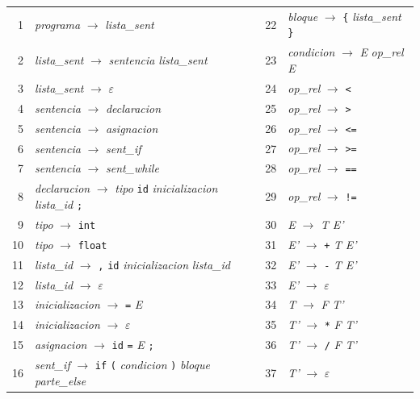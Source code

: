 \documentclass[12pt]{article}
\newcommand{\nt}[1]{\textit{#1}}
\begin{document}
\begin{table}[!htbp]
\centering\footnotesize
\renewcommand{\arraystretch}{1.1}
\begin{tabular}{@{}r l @{\hspace{0.8cm}} r l@{}}
\toprule
1 & \nt{programa} $\rightarrow$ \nt{lista\_sent} & 22 & \nt{bloque} $\rightarrow$ \texttt{\{} \nt{lista\_sent} \texttt{\}} \\
2 & \nt{lista\_sent} $\rightarrow$ \nt{sentencia} \nt{lista\_sent} & 23 & \nt{condicion} $\rightarrow$ \nt{E} \nt{op\_rel} \nt{E} \\
3 & \nt{lista\_sent} $\rightarrow$ $\varepsilon$ & 24 & \nt{op\_rel} $\rightarrow$ \texttt{<} \\
4 & \nt{sentencia} $\rightarrow$ \nt{declaracion} & 25 & \nt{op\_rel} $\rightarrow$ \texttt{>} \\
5 & \nt{sentencia} $\rightarrow$ \nt{asignacion} & 26 & \nt{op\_rel} $\rightarrow$ \texttt{<=} \\
6 & \nt{sentencia} $\rightarrow$ \nt{sent\_if} & 27 & \nt{op\_rel} $\rightarrow$ \texttt{>=} \\
7 & \nt{sentencia} $\rightarrow$ \nt{sent\_while} & 28 & \nt{op\_rel} $\rightarrow$ \texttt{==} \\
8 & \nt{declaracion} $\rightarrow$ \nt{tipo} \texttt{id} \nt{inicializacion} \nt{lista\_id} \texttt{;} & 29 & \nt{op\_rel} $\rightarrow$ \texttt{!=} \\
9 & \nt{tipo} $\rightarrow$ \texttt{int} & 30 & \nt{E} $\rightarrow$ \nt{T} \nt{E'} \\
10 & \nt{tipo} $\rightarrow$ \texttt{float} & 31 & \nt{E'} $\rightarrow$ \texttt{+} \nt{T} \nt{E'} \\
11 & \nt{lista\_id} $\rightarrow$ \texttt{,} \texttt{id} \nt{inicializacion} \nt{lista\_id} & 32 & \nt{E'} $\rightarrow$ \texttt{-} \nt{T} \nt{E'} \\
12 & \nt{lista\_id} $\rightarrow$ $\varepsilon$ & 33 & \nt{E'} $\rightarrow$ $\varepsilon$ \\
13 & \nt{inicializacion} $\rightarrow$ \texttt{=} \nt{E} & 34 & \nt{T} $\rightarrow$ \nt{F} \nt{T'} \\
14 & \nt{inicializacion} $\rightarrow$ $\varepsilon$ & 35 & \nt{T'} $\rightarrow$ \texttt{*} \nt{F} \nt{T'} \\
15 & \nt{asignacion} $\rightarrow$ \texttt{id} \texttt{=} \nt{E} \texttt{;} & 36 & \nt{T'} $\rightarrow$ \texttt{/} \nt{F} \nt{T'} \\
16 & \nt{sent\_if} $\rightarrow$ \texttt{if} \texttt{(} \nt{condicion} \texttt{)} \nt{bloque} \nt{parte\_else} & 37 & \nt{T'} $\rightarrow$ $\varepsilon$ \\

\end{tabular}
\end{table}
\end{document}
